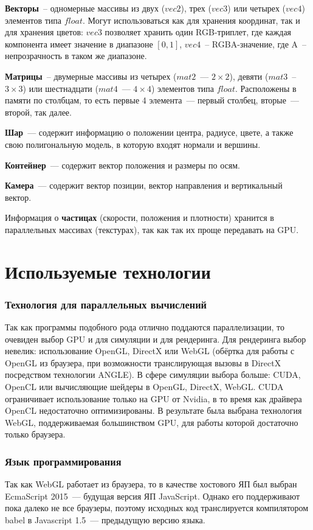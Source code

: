 \textbf{Векторы}~-- одномерные массивы из двух ($vec2$), трех ($vec3$) или четырех ($vec4$) элементов типа $float$. Могут использоваться как для хранения координат, так и для хранения цветов: $vec3$ позволяет хранить один RGB-триплет, где каждая компонента имеет значение в диапазоне $[0, 1]$, $vec4$~-- RGBA-значение, где A~-- непрозрачность в таком же диапазоне.

\textbf{Матрицы}~-- двумерные массивы из четырех ($mat2$~--- $2\times 2$), девяти ($mat3$~-- $3\times 3$) или шестнадцати ($mat4$~--- $4\times 4$) элементов типа $float$. Расположены в памяти по столбцам, то есть первые 4 элемента~--- первый столбец, вторые~--- второй, так далее.

\textbf{Шар}~--- содержит информацию о положении центра, радиусе, цвете, а также свою полигональную модель, в которую входят нормали и вершины.

\textbf{Контейнер}~--- содержит вектор положения и размеры по осям.

\textbf{Камера}~--- содержит вектор позиции, вектор направления и вертикальный вектор.

Информация о \textbf{частицах} (скорости, положения и плотности) хранится в параллельных массивах (текстурах), так как так их проще передавать на GPU.


\section{Используемые технологии}
\subsubsection*{Технология для параллельных вычислений}
Так как программы подобного рода отлично поддаются параллелизации, то очевиден выбор GPU и для симуляции и для рендеринга. Для рендеринга выбор невелик: использование OpenGL, DirectX или WebGL (обёртка для работы с OpenGL из браузера, при возможности транслирующая вызовы в DirectX посредством технологии ANGLE). В сфере симуляции выбора больше: CUDA, OpenCL или вычисляющие шейдеры в OpenGL, DirectX, WebGL. CUDA ограничивает использование только на GPU от Nvidia, в то время как драйвера OpenCL недостаточно оптимизированы. В результате была выбрана технология WebGL, поддерживаемая большинством GPU, для работы которой достаточно только браузера.


\subsubsection*{Язык программирования}
Так как WebGL работает из браузера, то в качестве хостового ЯП был выбран EcmaScript 2015~--- будущая версия ЯП JavaScript. Однако его поддерживают  пока далеко не все браузеры, поэтому исходных код транслируется компилятором babel в Javascript 1.5~--- предыдущую версию языка.

